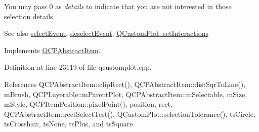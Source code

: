 You may pass 0 as {\itshape details} to indicate that you are not interested in those selection details.

\begin{DoxySeeAlso}{See also}
\hyperlink{class_q_c_p_abstract_item_aaf92af7b9893712959a6c073d334d88d}{select\+Event}, \hyperlink{class_q_c_p_abstract_item_a91f090d6763cfedb0749219c63788ae9}{deselect\+Event}, \hyperlink{class_q_custom_plot_a5ee1e2f6ae27419deca53e75907c27e5}{Q\+Custom\+Plot\+::set\+Interactions} 
\end{DoxySeeAlso}


Implements \hyperlink{class_q_c_p_abstract_item_a96d522d10ffc0413b9a366c6f7f0476b}{Q\+C\+P\+Abstract\+Item}.



Definition at line 23119 of file qcustomplot.\+cpp.



References Q\+C\+P\+Abstract\+Item\+::clip\+Rect(), Q\+C\+P\+Abstract\+Item\+::dist\+Sqr\+To\+Line(), m\+Brush, Q\+C\+P\+Layerable\+::m\+Parent\+Plot, Q\+C\+P\+Abstract\+Item\+::m\+Selectable, m\+Size, m\+Style, Q\+C\+P\+Item\+Position\+::pixel\+Point(), position, rect, Q\+C\+P\+Abstract\+Item\+::rect\+Select\+Test(), Q\+Custom\+Plot\+::selection\+Tolerance(), ts\+Circle, ts\+Crosshair, ts\+None, ts\+Plus, and ts\+Square.


